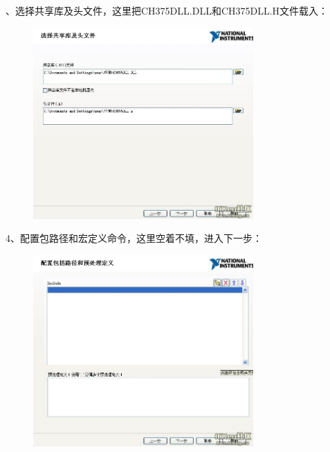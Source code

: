 、选择共享库及头文件，这里把CH375DLL.DLL和CH375DLL.H文件载入：
\begin{figure}[h!]
\centering
\includegraphics[width=0.75\textwidth]{pictures/3.jpg}
\end{figure}

4、配置包路径和宏定义命令，这里空着不填，进入下一步：
\begin{figure}[h!]
\centering
\includegraphics[width=0.75\textwidth]{pictures/4.jpg}
\end{figure}

